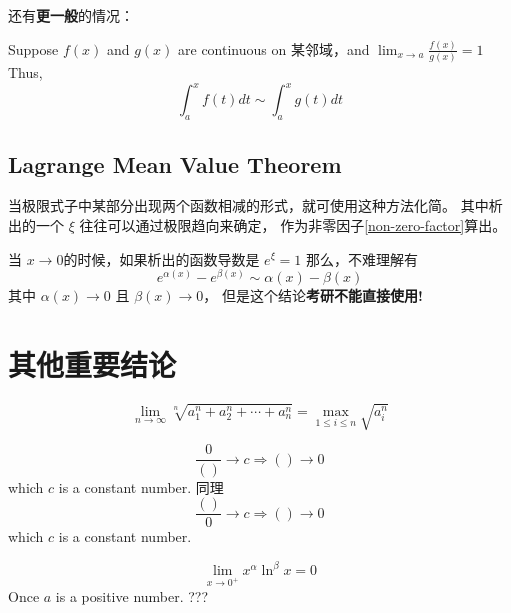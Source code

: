 还有\textbf{更一般}的情况：
\begin{lemma}
	Suppose $f(x)$ and $g(x)$ are continuous on 某邻域，and $\lim_{x \to a} \frac{f(x)}{g(x)} = 1$ 
	Thus, 
	\begin{equation}
		\int_a^{x} f(t) dt \sim \int_a^{x} g(t) dt
	\end{equation}
\end{lemma}

\subsection{Lagrange Mean Value Theorem} \label{lagrange-limit}
当极限式子中某部分出现两个函数相减的形式，就可使用这种方法化简。
其中析出的一个 $\xi$ 往往可以通过极限趋向来确定，
作为非零因子\ref{non-zero-factor}算出。

当 $x\to0$的时候，如果析出的函数导数是 $e^{\xi} = 1$ 那么，不难理解有
\begin{equation}
	e^{\alpha(x)} - e^{\beta(x)} \sim \alpha(x) - \beta(x)
\end{equation}
其中 $\alpha(x) \to 0$ 且 $\beta(x) \to 0$，
但是这个结论\textbf{考研不能直接使用!}

\section{其他重要结论}
\begin{lemma}
	\begin{equation}
		\lim_{n \to \infty} \sqrt[n]{a^{n}_{1} + a^{n}_{2} + 
        \cdots + a^{n}_{n}} = \max_{1\leq i \leq n}{\sqrt{a_{i}^{n}}}
	\end{equation}
\end{lemma}

\begin{lemma}
    \begin{equation}
        \frac{0}{()} \to c \Rightarrow () \to 0
    \end{equation}
    which $c$ is a constant number.
    同理
    \begin{equation}
        \frac{()}{0} \to c \Rightarrow () \to 0
    \end{equation}
    which $c$ is a constant number.
\end{lemma}

\begin{lemma}
    \[
        \lim_{x \to 0^+} x^{\alpha} \ln^{\beta}x = 0
    \]
    Once $a$ is a positive number. ??? %
\end{lemma}

